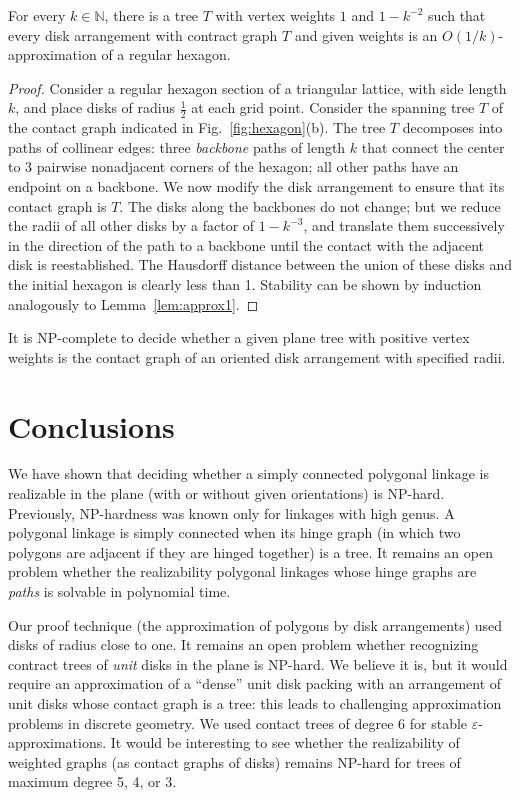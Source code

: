 \documentclass{llncs}
\begin{document}
\begin{lemma}\label{lem:approx2}
For every $k\in \mathbb{N}$, there is a tree $T$ with vertex weights $1$ and $1-k^{-2}$ such that
every disk arrangement with contract graph $T$ and given weights is an $O(1/k)$-approximation of a regular hexagon.
\end{lemma}
\begin{proof}
Consider a regular hexagon section of a triangular lattice, with side length $k$, and place disks of radius $\frac{1}{2}$ at each grid point. Consider the spanning tree $T$ of the contact graph indicated in Fig.~\ref{fig:hexagon}(b). The tree $T$ decomposes into paths of collinear edges: three \emph{backbone} paths of length $k$ that connect the center to 3 pairwise nonadjacent corners of the hexagon; all other paths have an endpoint on a backbone. We now modify the disk arrangement to ensure that its contact graph is $T$. The disks along the backbones do not change; but we reduce the radii of all other disks by a factor of $1-k^{-3}$, and translate them successively in the direction of the path to a backbone until the contact with the adjacent disk is reestablished. The Hausdorff distance between the union of these disks and the initial hexagon is clearly less than 1.
Stability can be shown by induction analogously to Lemma~\ref{lem:approx1}.
\end{proof}


\begin{theorem}\label{thm:disk2}
It is NP-complete to decide whether a given plane tree with positive vertex weights
is the contact graph of an oriented disk arrangement with specified radii.
\end{theorem}


\section{Conclusions \label{sec:con}}

We have shown that deciding whether a simply connected polygonal linkage is realizable in the plane (with or without given orientations) is NP-hard. Previously, NP-hardness was known only for linkages with high genus. A polygonal linkage is simply connected when its hinge graph (in which two polygons are adjacent if they are hinged together) is a tree. It remains an open problem whether the realizability polygonal linkages whose hinge graphs are \emph{paths}
is solvable in  polynomial time.

Our proof technique (the approximation of polygons by disk arrangements) used disks of radius close to one. It remains an open problem whether recognizing contract trees of \emph{unit} disks in the plane is NP-hard. We believe it is, but it would require an approximation of a ``dense'' unit disk packing with an arrangement of unit disks whose contact graph is a tree: this leads to challenging approximation problems in discrete geometry. We used contact trees of degree 6 for stable $\varepsilon$-approximations. It would be interesting to see whether the realizability of weighted graphs (as contact graphs of disks) remains NP-hard for trees of maximum degree 5, 4, or 3.
\end{document}
